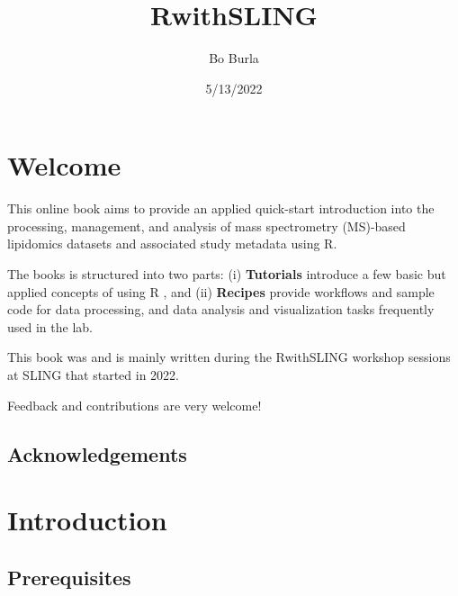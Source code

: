 \documentclass[
  letterpaper,
  DIV=11,
  numbers=noendperiod]{scrreprt}
\title{RwithSLING}
\author{Bo Burla}
\date{5/13/2022}
\renewcommand*\contentsname{Table of contents}
\newcommand\contentsname{Table of contents}
\begin{document}
\maketitle
\ifdefined\Shaded\renewenvironment{Shaded}{\begin{tcolorbox}[frame hidden, sharp corners, borderline west={3pt}{0pt}{shadecolor}, breakable, boxrule=0pt, interior hidden, enhanced]}{\end{tcolorbox}}\fi

\renewcommand*\contentsname{Table of contents}
{
\hypersetup{linkcolor=}
\setcounter{tocdepth}{2}
\tableofcontents
}

\hypertarget{welcome}{%
\chapter*{Welcome}\label{welcome}}

This online book aims to provide an applied quick-start introduction
into the processing, management, and analysis of mass spectrometry
(MS)-based lipidomics datasets and associated study metadata using R.

The books is structured into two parts: (i) \textbf{Tutorials} introduce
a few basic but applied concepts of using R , and (ii) \textbf{Recipes}
provide workflows and sample code for data processing, and data analysis
and visualization tasks frequently used in the lab.

This book was and is mainly written during the RwithSLING workshop
sessions at SLING that started in 2022.

Feedback and contributions are very welcome!

\hypertarget{acknowledgements}{%
\section*{Acknowledgements}\label{acknowledgements}}


\hypertarget{sec-intro}{%
\chapter{Introduction}\label{sec-intro}}

\hypertarget{prerequisites}{%
\section{Prerequisites}\label{prerequisites}}
\end{document}
